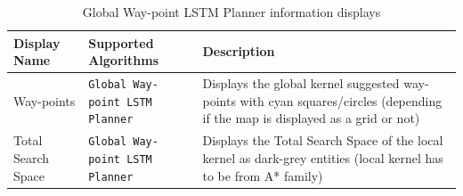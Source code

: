 \begin{table}[h!]
    \centerfloat
    \begin{tabular}{|M{2cm}|M{2.7cm}|M{9cm}|}
         \hline
         \textbf{Display Name} & \textbf{Supported Algorithms} & \textbf{Description} \\
         \hline
         Way-points & \texttt{Global Way-point LSTM Planner} & Displays the global kernel suggested way-points with cyan squares/circles (depending if the map is displayed as a grid or not) \\
         \hline
         Total Search Space & \texttt{Global Way-point LSTM Planner} & Displays the Total Search Space of the local kernel as dark-grey entities (local kernel has to be from A* family) \\
         \hline
    \end{tabular}
    \caption{Global Way-point LSTM Planner information displays}
    \label{tab: WayPointNavigation map_dsiplays}
\end{table}


